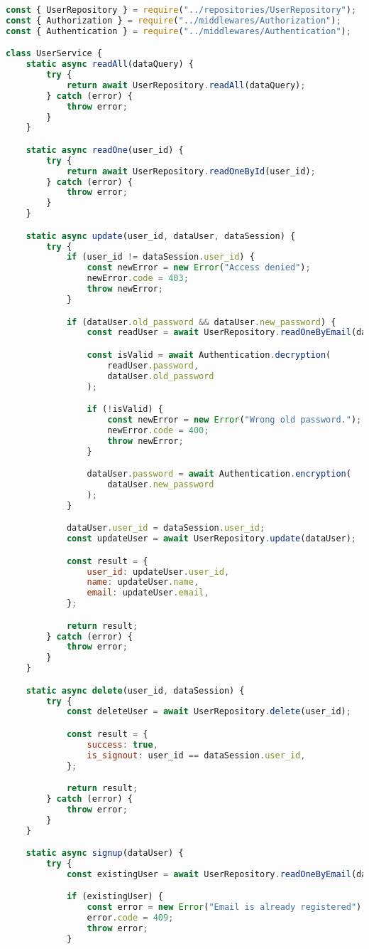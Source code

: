 \begin{lstlisting}[language=Javascript,caption={User Service}]
const { UserRepository } = require("../repositories/UserRepository");
const { Authorization } = require("../middlewares/Authorization");
const { Authentication } = require("../middlewares/Authentication");

class UserService {
	static async readAll(dataQuery) {
		try {
			return await UserRepository.readAll(dataQuery);
		} catch (error) {
			throw error;
		}
	}

	static async readOne(user_id) {
		try {
			return await UserRepository.readOneById(user_id);
		} catch (error) {
			throw error;
		}
	}

	static async update(user_id, dataUser, dataSession) {
		try {
			if (user_id != dataSession.user_id) {
				const newError = new Error("Access denied");
				newError.code = 403;
				throw newError;
			}

			if (dataUser.old_password && dataUser.new_password) {
				const readUser = await UserRepository.readOneByEmail(dataSession.email);

				const isValid = await Authentication.decryption(
					readUser.password,
					dataUser.old_password
				);

				if (!isValid) {
					const newError = new Error("Wrong old password.");
					newError.code = 400;
					throw newError;
				}

				dataUser.password = await Authentication.encryption(
					dataUser.new_password
				);
			}

			dataUser.user_id = dataSession.user_id;
			const updateUser = await UserRepository.update(dataUser);

			const result = {
				user_id: updateUser.user_id,
				name: updateUser.name,
				email: updateUser.email,
			};

			return result;
		} catch (error) {
			throw error;
		}
	}

	static async delete(user_id, dataSession) {
		try {
			const deleteUser = await UserRepository.delete(user_id);

			const result = {
				success: true,
				is_signout: user_id == dataSession.user_id,
			};

			return result;
		} catch (error) {
			throw error;
		}
	}

	static async signup(dataUser) {
		try {
			const existingUser = await UserRepository.readOneByEmail(dataUser.email);

			if (existingUser) {
				const error = new Error("Email is already registered");
				error.code = 409;
				throw error;
			}


\end{lstlisting}
